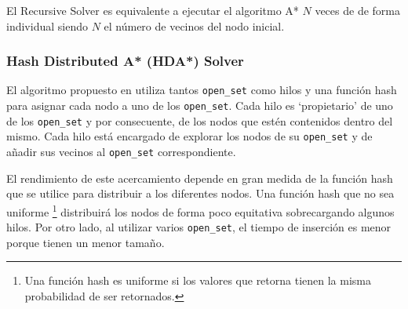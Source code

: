 \begin{keynotebox}
    El Recursive Solver es equivalente a ejecutar el algoritmo A*
    $N$ veces de de forma individual siendo $N$ el número
    de vecinos del nodo inicial.
\end{keynotebox}

\pagebreak

\subsubsection{Hash Distributed A* (HDA*) Solver}

El algoritmo propuesto en \cite{KFB09}
utiliza tantos \lstinline{open_set} como hilos
y una función hash para asignar cada nodo a uno de los
\lstinline{open_set}.
Cada hilo es `propietario' de uno de los \lstinline{open_set}
y por consecuente, de los nodos que estén contenidos
dentro del mismo.
Cada hilo está encargado de explorar los nodos de su
\lstinline{open_set} y de añadir sus vecinos
al \lstinline{open_set} correspondiente.

El rendimiento de este acercamiento depende en gran medida de la
función hash que se utilice para distribuir a los diferentes nodos.
Una función hash que no sea uniforme
\footnote{Una función hash es uniforme si los valores que retorna
tienen la misma probabilidad de ser retornados.}
distribuirá los nodos de forma poco equitativa
sobrecargando algunos hilos.
Por otro lado, al utilizar varios \lstinline{open_set},
el tiempo de inserción es menor porque tienen un menor tamaño.


